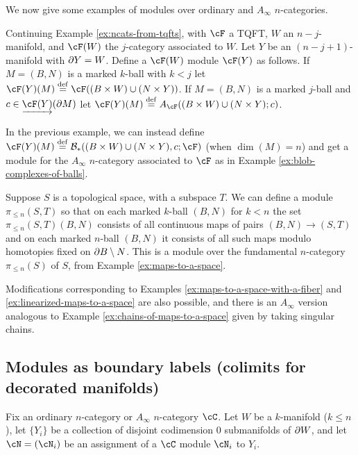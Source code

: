 \medskip

We now give some examples of modules over ordinary and $A_\infty$ $n$-categories.

\begin{example}
\rm
Continuing Example \ref{ex:ncats-from-tqfts}, with $\cF$ a TQFT, $W$ an $n{-}j$-manifold,
and $\cF(W)$ the $j$-category associated to $W$.
Let $Y$ be an $(n{-}j{+}1)$-manifold with $\partial Y = W$.
Define a $\cF(W)$ module $\cF(Y)$ as follows.
If $M = (B, N)$ is a marked $k$-ball with $k<j$ let 
$\cF(Y)(M)\deq \cF((B\times W) \cup (N\times Y))$.
If $M = (B, N)$ is a marked $j$-ball and $c\in \cl{\cF(Y)}(\bd M)$ let
$\cF(Y)(M)\deq A_\cF((B\times W) \cup (N\times Y); c)$.
\end{example}

\begin{example} \label{bc-module-example}
\rm
In the previous example, we can instead define
$\cF(Y)(M)\deq \bc_*((B\times W) \cup (N\times Y), c; \cF)$ (when $\dim(M) = n$)
and get a module for the $A_\infty$ $n$-category associated to $\cF$ as in 
Example \ref{ex:blob-complexes-of-balls}.
\end{example}


\begin{example}
\rm
Suppose $S$ is a topological space, with a subspace $T$.
We can define a module $\pi_{\leq n}(S,T)$ so that on each marked $k$-ball $(B,N)$ 
for $k<n$ the set $\pi_{\leq n}(S,T)(B,N)$ consists of all continuous maps of pairs 
$(B,N) \to (S,T)$ and on each marked $n$-ball $(B,N)$ it consists of all 
such maps modulo homotopies fixed on $\partial B \setminus N$.
This is a module over the fundamental $n$-category $\pi_{\leq n}(S)$ of $S$, from Example \ref{ex:maps-to-a-space}.
\end{example}
Modifications corresponding to Examples \ref{ex:maps-to-a-space-with-a-fiber} and 
\ref{ex:linearized-maps-to-a-space} are also possible, and there is an $A_\infty$ version analogous to 
Example \ref{ex:chains-of-maps-to-a-space} given by taking singular chains.





\subsection{Modules as boundary labels (colimits for decorated manifolds)}
\label{moddecss}

Fix an ordinary $n$-category or $A_\infty$ $n$-category  $\cC$.
Let $W$ be a $k$-manifold ($k\le n$),
let $\{Y_i\}$ be a collection of disjoint codimension 0 submanifolds of $\partial W$,
and let $\cN = (\cN_i)$ be an assignment of a $\cC$ module $\cN_i$ to $Y_i$.

